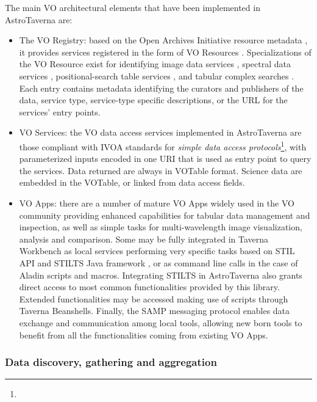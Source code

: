 \documentclass{aa}
\begin{document}
The main VO architectural elements that have been implemented in AstroTaverna are:

\begin{itemize}
\item The VO Registry: based on the Open Archives Initiative resource metadata \citep{2002OAI-PMH},  it provides services registered in the form of VO Resources  \citep{Hanisch2007}. Specializations of the VO Resource exist for identifying image data services \citep[Simple Image Access Protocol;][]{Tody2009}, spectral data services \citep[Simple Spectral Access Protocol;][]{Tody2012}, positional-search table services \citep[ConeSearch Protocol;][]{Williams2008}, and tabular complex searches \citep[Tabular Access Protocol;][]{Dowler2010}. Each entry contains metadata identifying the curators and publishers of the data, service type, service-type specific descriptions, or the URL for the services’ entry points. 

\item VO Services: the VO data access services implemented in AstroTaverna are those compliant with IVOA standards for \textit{simple data access protocols}\footnote{}, with parameterized inputs encoded in one URI that is used as entry point to query the services. Data returned are always in VOTable format. Science data are embedded in the VOTable, or linked from data access fields.

\item VO Apps: there are a number of mature VO Apps widely used in the VO community providing enhanced capabilities for tabular data management and inspection, as well as simple tasks for multi-wavelength image visualization, analysis and comparison. Some may be fully integrated in Taverna Workbench as local services performing very specific tasks based on STIL API and STILTS Java framework \citep{Taylor2006}, or as command line calls in the case of Aladin scripts and macros. Integrating STILTS in AstroTaverna also grants direct access to most common functionalities provided by this library. Extended functionalities may be accessed making use of scripts through Taverna Beanshells. Finally, the SAMP \citep[Simple Application Messaging Protocol;][]{Taylor2012} messaging protocol enables data exchange and communication among local tools, allowing new born tools to benefit from all the functionalities coming from existing VO Apps.
\end{itemize}

\subsubsection{Data discovery, gathering and aggregation}
\label{DataDiscovery}
\end{document}
